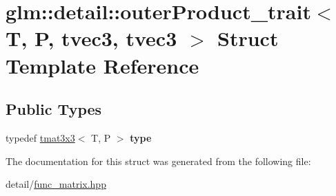 \hypertarget{structglm_1_1detail_1_1outerProduct__trait_3_01T_00_01P_00_01tvec3_00_01tvec3_01_4}{\section{glm\-:\-:detail\-:\-:outer\-Product\-\_\-trait$<$ T, P, tvec3, tvec3 $>$ Struct Template Reference}
\label{structglm_1_1detail_1_1outerProduct__trait_3_01T_00_01P_00_01tvec3_00_01tvec3_01_4}
}
\subsection*{Public Types}
\begin{DoxyCompactItemize}
\item 
\hypertarget{structglm_1_1detail_1_1outerProduct__trait_3_01T_00_01P_00_01tvec3_00_01tvec3_01_4_ac6a4ba81935840a9b4e4603f0bc0e222}{typedef \hyperlink{structglm_1_1tmat3x3}{tmat3x3}$<$ T, P $>$ {\bfseries type}}\label{structglm_1_1detail_1_1outerProduct__trait_3_01T_00_01P_00_01tvec3_00_01tvec3_01_4_ac6a4ba81935840a9b4e4603f0bc0e222}

\end{DoxyCompactItemize}


The documentation for this struct was generated from the following file\-:\begin{DoxyCompactItemize}
\item 
detail/\hyperlink{func__matrix_8hpp}{func\-\_\-matrix.\-hpp}\end{DoxyCompactItemize}
